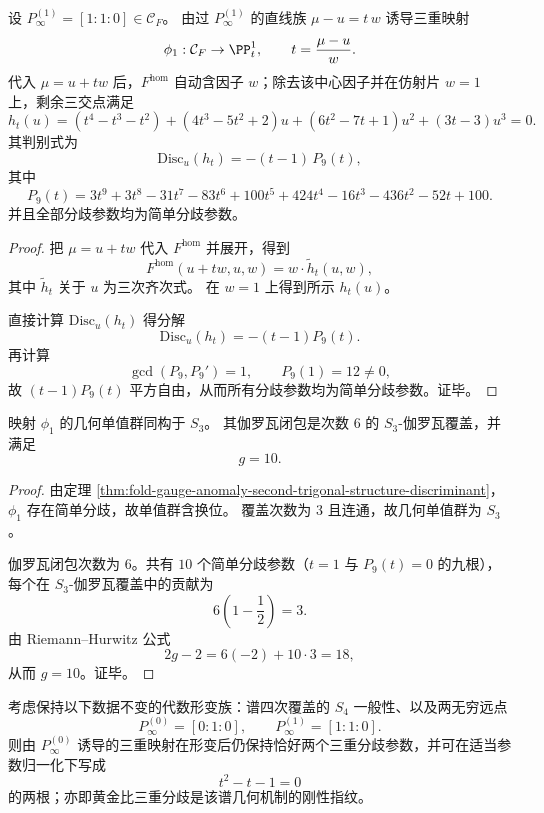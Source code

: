 \begin{theorem}[第二三重结构的参数判别式]\label{thm:fold-gauge-anomaly-second-trigonal-structure-discriminant}
设 \(P_\infty^{(1)}=[1:1:0]\in\mathcal C_F\)。
由过 \(P_\infty^{(1)}\) 的直线族 \(\mu-u=t\,w\) 诱导三重映射
\[
\phi_1:\mathcal C_F\to\PP^1_t,\qquad t=\frac{\mu-u}{w}.
\]
代入 \(\mu=u+t w\) 后，\(F^{\mathrm{hom}}\) 自动含因子 \(w\)；除去该中心因子并在仿射片 \(w=1\) 上，剩余三交点满足
\[
h_t(u)= (t^4-t^3-t^2)+ (4t^3-5t^2+2)u+(6t^2-7t+1)u^2+(3t-3)u^3=0.
\]
其判别式为
\[
\mathrm{Disc}_u(h_t)=-(t-1)\,P_9(t),
\]
其中
\[
P_9(t)=3t^9+3t^8-31t^7-83t^6+100t^5+424t^4-16t^3-436t^2-52t+100.
\]
并且全部分歧参数均为简单分歧参数。
\end{theorem}
\begin{proof}
把 \(\mu=u+t w\) 代入 \(F^{\mathrm{hom}}\) 并展开，得到
\[
F^{\mathrm{hom}}(u+t w,u,w)=w\cdot \widetilde h_t(u,w),
\]
其中 \(\widetilde h_t\) 关于 \(u\) 为三次齐次式。
在 \(w=1\) 上得到所示 \(h_t(u)\)。

直接计算 \(\mathrm{Disc}_u(h_t)\) 得分解
\[
\mathrm{Disc}_u(h_t)=-(t-1)P_9(t).
\]
再计算
\[
\gcd(P_9,P_9')=1,\qquad P_9(1)=12\neq 0,
\]
故 \((t-1)P_9(t)\) 平方自由，从而所有分歧参数均为简单分歧参数。证毕。
\end{proof}

\begin{corollary}[第二三重结构的几何单值群与伽罗瓦闭包亏格]\label{cor:fold-gauge-anomaly-second-trigonal-monodromy-genus}
映射 \(\phi_1\) 的几何单值群同构于 \(S_3\)。
其伽罗瓦闭包是次数 \(6\) 的 \(S_3\)-伽罗瓦覆盖，并满足
\[
g=10.
\]
\end{corollary}
\begin{proof}
由定理 \ref{thm:fold-gauge-anomaly-second-trigonal-structure-discriminant}，\(\phi_1\) 存在简单分歧，故单值群含换位。
覆盖次数为 \(3\) 且连通，故几何单值群为 \(S_3\)。

伽罗瓦闭包次数为 \(6\)。共有 \(10\) 个简单分歧参数（\(t=1\) 与 \(P_9(t)=0\) 的九根），每个在 \(S_3\)-伽罗瓦覆盖中的贡献为
\[
6\left(1-\frac12\right)=3.
\]
由 Riemann--Hurwitz 公式
\[
2g-2=6(-2)+10\cdot 3=18,
\]
从而 \(g=10\)。证毕。
\end{proof}

\begin{conjecture}[黄金比三重分歧的结构刚性]\label{conj:fold-gauge-anomaly-golden-ratio-triple-branch-rigidity}
考虑保持以下数据不变的代数形变族：谱四次覆盖的 \(S_4\) 一般性、以及两无穷远点
\[
P_\infty^{(0)}=[0:1:0],\qquad P_\infty^{(1)}=[1:1:0].
\]
则由 \(P_\infty^{(0)}\) 诱导的三重映射在形变后仍保持恰好两个三重分歧参数，并可在适当参数归一化下写成
\[
t^2-t-1=0
\]
的两根；亦即黄金比三重分歧是该谱几何机制的刚性指纹。
\end{conjecture}

